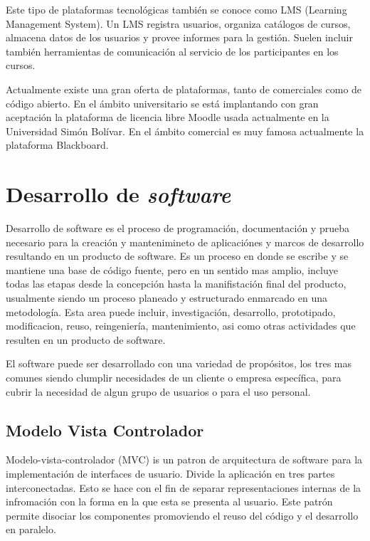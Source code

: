 Este tipo de plataformas tecnológicas también se conoce como LMS (Learning Management System). Un LMS registra usuarios, organiza catálogos de cursos, almacena datos de los usuarios y provee informes para la gestión. Suelen incluir también herramientas de comunicación al servicio de los participantes en los cursos. 

Actualmente existe una gran oferta de plataformas, tanto de comerciales como de código abierto. En el ámbito universitario se está implantando con gran aceptación la plataforma de licencia libre Moodle usada actualmente en la Universidad Simón Bolívar. En el ámbito comercial es muy famosa actualmente la plataforma Blackboard.

\section{Desarrollo de \emph{software}}

Desarrollo de software es el proceso de programación, documentación y prueba necesario para la creación y mantenimineto de aplicaciónes y marcos de desarrollo resultando en un producto de software. Es un proceso en donde se escribe y se mantiene una base de código fuente, pero en un sentido mas amplio, incluye todas las etapas desde la concepción hasta la manifistación final del producto, usualmente siendo un proceso planeado y estructurado enmarcado en una metodología. Esta area puede incluir, investigación, desarrollo, prototipado, modificacion, reuso, reingeniería, mantenimiento, asi como otras actividades que resulten en un producto de software.

El software puede ser desarrollado con una variedad de propósitos, los tres mas comunes siendo clumplir necesidades de un cliente o empresa específica, para cubrir la necesidad de algun grupo de usuarios o para el uso personal.

\subsection{Modelo Vista Controlador}

Modelo-vista-controlador (MVC) is un patron de arquitectura de software para la implementación de interfaces de usuario. Divide la aplicación en tres partes interconectadas. Esto se hace con el fin de separar representaciones internas de la infromación con la forma en la que esta se presenta al usuario. Este patrón permite disociar los componentes promoviendo el reuso del código y el desarrollo en paralelo.

